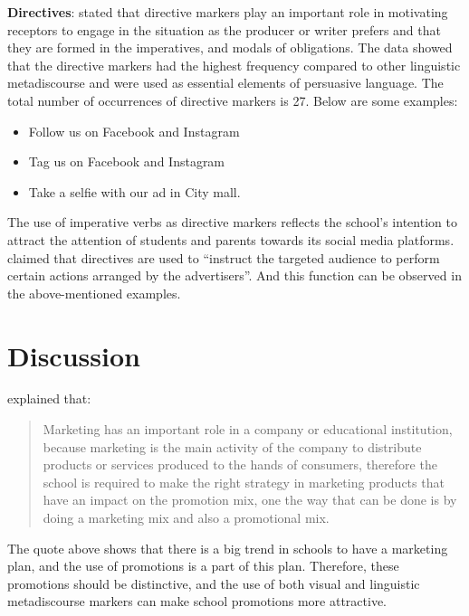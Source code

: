 \documentclass[english]{textolivre}
\begin{document}
\textbf{Directives}: \textcite{hyland_metadiscourse:_2005} stated that directive markers play an important role in motivating receptors to engage in the situation as the producer or writer prefers and that they are formed in the imperatives, and modals of obligations. The data showed that the directive markers had the highest frequency compared to other linguistic metadiscourse and were used as essential elements of persuasive language. The total number of occurrences of directive markers is 27. Below are some examples: 

\begin{itemize}
    \item Follow us on Facebook and Instagram
    \item Tag us on Facebook and Instagram
    \item Take a selfie with our ad in City mall.
\end{itemize}

The use of imperative verbs as directive markers reflects the school’s intention to attract the attention of students and parents towards its social media platforms. \textcite[p.~29]{al-subhi_metadiscourse_2022} claimed that directives are used to “instruct the targeted audience to perform certain actions arranged by the advertisers”. And this function can be observed in the above-mentioned examples.

\section{Discussion}

\textcite[p.~264]{rohim_marketing_2019} explained that:

\begin{quote}
    Marketing has an important role in a company or educational institution, because marketing is the main activity of the company to distribute products or services produced to the hands of consumers, therefore the school is required to make the right strategy in marketing products that have an impact on the promotion mix, one the way that can be done is by doing a marketing mix and also a promotional mix.
\end{quote}

The quote above shows that there is a big trend in schools to have a marketing plan, and the use of promotions is a part of this plan. Therefore, these promotions should be distinctive, and the use of both visual and linguistic metadiscourse markers can make school promotions more attractive.
\end{document}
